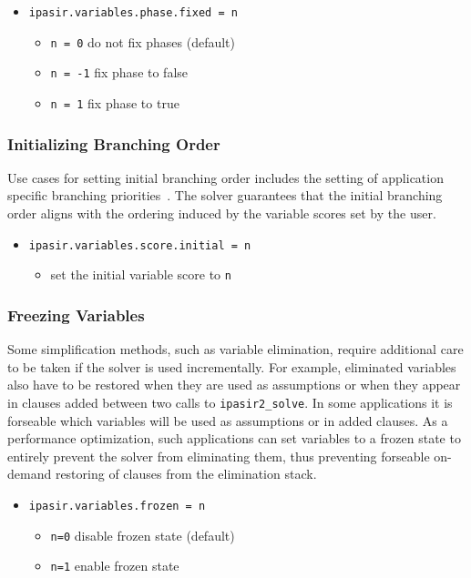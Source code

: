 \documentclass[sat]{iosart2x}
\begin{document}
\begin{itemize}
    \item \texttt{ipasir.variables.phase.fixed = n}
    \begin{itemize}
        \item \texttt{n = 0} do not fix phases (default)
        \item \texttt{n = -1} fix phase to false
        \item \texttt{n = 1} fix phase to true
    \end{itemize}
\end{itemize}

\subsubsection{Initializing Branching Order}
Use cases for setting initial branching order includes the setting of application specific branching priorities~\cite{Iser:2012:MinisatKodkod}.
The solver guarantees that the initial branching order aligns with the ordering induced by the variable scores set by the user.

\begin{itemize}
    \item \texttt{ipasir.variables.score.initial = n} 
    \begin{itemize}
        \item set the initial variable score to \texttt{n}
    \end{itemize}
\end{itemize}

\subsubsection{Freezing Variables}
Some simplification methods, such as variable elimination, require additional care to be taken if the solver is used incrementally.
For example, eliminated variables also have to be restored when they are used as assumptions or when they appear in clauses added between two calls to \texttt{ipasir2\_solve}.
In some applications it is forseable which variables will be used as assumptions or in added clauses.
As a performance optimization, such applications can set variables to a frozen state to entirely prevent the solver from eliminating them, thus preventing forseable on-demand restoring of clauses from the elimination stack.

\begin{itemize}
    \item \texttt{ipasir.variables.frozen = n}
    \begin{itemize}
        \item \texttt{n=0} disable frozen state (default)
        \item \texttt{n=1} enable frozen state
    \end{itemize}
\end{itemize}
\end{document}
